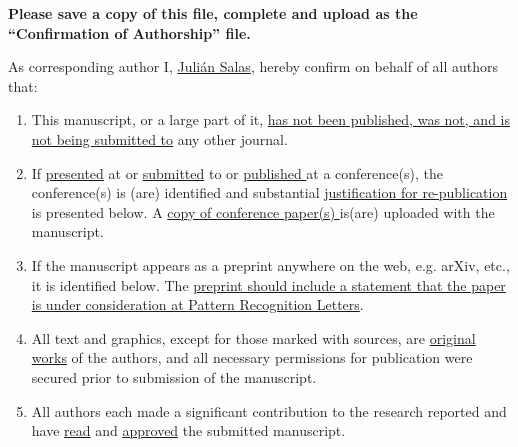 \documentclass[times,twocolumn,final,authoryear]{elsarticle}
\begin{document}
\thispagestyle{empty}
                                                             
\begin{table}[!th]

\begin{minipage}{.9\textwidth}
\baselineskip12pt
\ifpreprint
  \vspace*{1pc}
\else
  \vspace*{-6pc}
\fi

\vskip6pt


\vskip1pc


{\bf Please save a copy of this file, complete and upload as the 
``Confirmation of Authorship'' file.}

\vskip1pc

As corresponding author 
I, \underline{Juli\'an Salas}, 
hereby confirm on behalf of all authors that:

\vskip1pc

\begin{enumerate}
\itemsep=3pt
\item This manuscript, or a large part of it, \underline {has not been
published,  was not, and is not being submitted to} any other journal. 

\item If \underline {presented} at or \underline {submitted} to or
\underline  {published }at a conference(s), the conference(s) is (are)
identified and  substantial \underline {justification for
re-publication} is presented  below. A \underline {copy of
conference paper(s) }is(are) uploaded with the  manuscript.

\item If the manuscript appears as a preprint anywhere on the web, e.g.
arXiv,  etc., it is identified below. The \underline {preprint should
include a  statement that the paper is under consideration at Pattern
Recognition  Letters}.

\item All text and graphics, except for those marked with sources, are
\underline  {original works} of the authors, and all necessary
permissions for  publication were secured prior to submission of the
manuscript.

\item All authors each made a significant contribution to the research
reported  and have \underline {read} and \underline {approved} the
submitted  manuscript. 
\end{enumerate}


\end{minipage}
\end{table}
\end{document}
